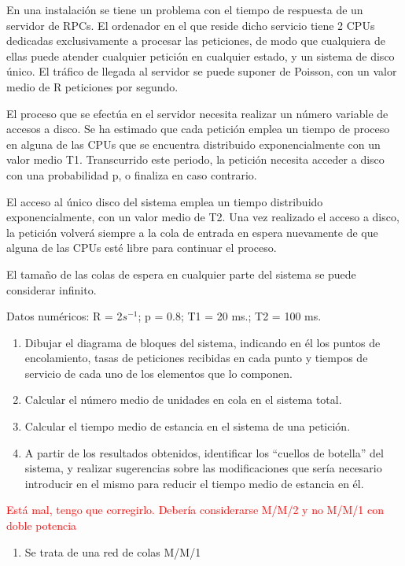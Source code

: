 \begin{problem}[17]
En una instalación se tiene un problema con el tiempo de respuesta de un servidor de RPCs. El ordenador en el que reside dicho servicio tiene 2 CPUs dedicadas exclusivamente a procesar las peticiones, de modo que cualquiera de ellas puede atender cualquier petición en cualquier estado, y un sistema de disco único. El tráfico de llegada al servidor se puede suponer de Poisson, con un valor medio de R peticiones por segundo.

El proceso que se efectúa en el servidor necesita realizar un número variable de accesos a disco. Se ha estimado que cada petición emplea un tiempo de proceso en alguna de las CPUs que se encuentra distribuido exponencialmente con un valor medio T1. Transcurrido este periodo, la petición necesita acceder a disco con una probabilidad p, o finaliza en caso contrario.

El acceso al único disco del sistema emplea un tiempo distribuido exponencialmente, con un valor medio de T2.
Una vez realizado el acceso a disco, la petición volverá siempre a la cola de entrada en espera nuevamente de que alguna de las CPUs esté libre para continuar el proceso.

El tamaño de las colas de espera en cualquier parte del sistema se puede considerar infinito.

Datos numéricos: R = 2$s^{-1}$; p = 0.8; T1 = 20 ms.; T2 = 100 ms.
\begin{enumerate}
\item Dibujar el diagrama de bloques del sistema, indicando en él los puntos de encolamiento, tasas de peticiones recibidas en cada punto y tiempos de servicio de cada uno de los elementos que lo componen.
\item Calcular el número medio de unidades en cola en el sistema total.
\item Calcular el tiempo medio de estancia en el sistema de una petición.
\item A partir de los resultados obtenidos, identificar los ``cuellos de botella'' del sistema, y realizar sugerencias sobre las modificaciones que sería necesario introducir en el mismo para reducir el tiempo medio de estancia en él.
\end{enumerate}
\solution

\textcolor{red}{Está mal, tengo que corregirlo. Debería considerarse M/M/2 y no M/M/1 con doble potencia}

\begin{enumerate}
\item Se trata de una red de colas M/M/1


\end{enumerate}
\end{problem}
